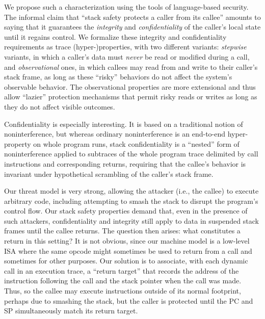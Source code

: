 \documentclass[acmtog,review,anonymous]{acmart}\settopmatter{printfolios=true,printccs=false,printacmref=false}
\begin{document}
We propose such a characterization
using the tools of language-based security. The informal claim that
``stack safety protects a caller from its callee'' amounts to saying
that it guarantees
the {\em integrity} and {\em confidentiality} of the caller's local state
until it regains control.
%
We formalize these integrity and confidentiality requirements as trace
(hyper-)properties, with two different
variants: {\em stepwise} variants, in which a caller's data must {\em never} be
read or modified during a call, and {\em observational} ones, in which
callees may read from and write to their caller's stack frame, as
long as these ``risky'' behaviors do not affect the system's observable
behavior. The observational properties are more extensional and thus
allow ``lazier'' protection mechanisms that permit risky reads or
writes as long as they do not affect visible outcomes.

Confidentiality is especially interesting.  It is based on a traditional
notion of noninterference, but whereas ordinary noninterference is
an end-to-end hyper-property on whole program runs, stack confidentiality is
a ``nested'' form of
noninterference applied to
subtraces of the whole program trace delimited by call instructions and
corresponding returns, requiring that the callee's behavior is invariant
under hypothetical scrambling of the caller's stack frame.

Our threat model is very strong, allowing the attacker (i.e., the callee) to
execute arbitrary code, including attempting to smash
the stack to disrupt the program's control flow.
Our stack safety properties demand that, even in the presence of such
attackers, confidentiality and integrity
still apply to data in suspended stack frames until the callee returns.
The question then arises:
what constitutes a return in this setting? It is not obvious, since
our machine model is a low-level ISA where the same opcode might
sometimes
be used to return from a call and sometimes for other purposes.
Our solution is to associate, with each dynamic call in an execution trace, a
``return target'' that records the address of the instruction following the
call and the stack pointer when the call was made. Thus, so the callee may
execute instructions outside of its normal footprint, perhaps due to
smashing the stack, but
the caller is protected until the PC and SP simultaneously match its return
target.
\end{document}
